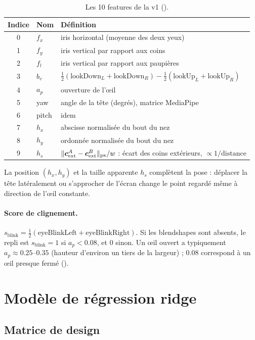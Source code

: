 \begin{table}[H]
\centering\small
\begin{tabularx}{\textwidth}{@{}c l L@{}}
\toprule
Indice & Nom & Définition \\
 & $f_x$ & iris horizontal (moyenne des deux yeux) \\
1 & $f_y$ & iris vertical par rapport aux coins \\
2 & $f_l$ & iris vertical par rapport aux paupières \\
3 & $b_v$ & $\tfrac12(\text{lookDown}_L + \text{lookDown}_R) - \tfrac12(\text{lookUp}_L + \text{lookUp}_R)$ \\
4 & $a_p$ & ouverture de l'œil \\
5 & yaw & angle de la tête (degrés), matrice MediaPipe \\
6 & pitch & idem \\
7 & $h_x$ & abscisse normalisée du bout du nez \\
8 & $h_y$ & ordonnée normalisée du bout du nez \\
9 & $h_s$ & $\|\bm{c}^A_\text{ext} - \bm{c}^B_\text{ext}\|_\text{px} / w$ : écart des coins extérieurs, $\propto 1/\text{distance}$ \\
\bottomrule
\end{tabularx}
\caption{Les 10 features de la v1 ().}
\end{table}

La position $(h_x, h_y)$ et la taille apparente $h_s$ complètent la pose : déplacer la tête latéralement ou s'approcher de l'écran change le point regardé même à direction de l'œil constante.

\paragraph{Score de clignement.} $s_\text{blink} = \tfrac12(\text{eyeBlinkLeft} + \text{eyeBlinkRight})$. Si les blendshapes sont absents, le repli est $s_\text{blink} = 1$ si $a_p < \num{0.08}$, et $0$ sinon. Un œil ouvert a typiquement $a_p \approx \numrange{0.25}{0.35}$ (hauteur d'environ un tiers de la largeur) ; \num{0.08} correspond à un œil presque fermé (\empi).

\section{Modèle de régression ridge}

\subsection{Matrice de design}


